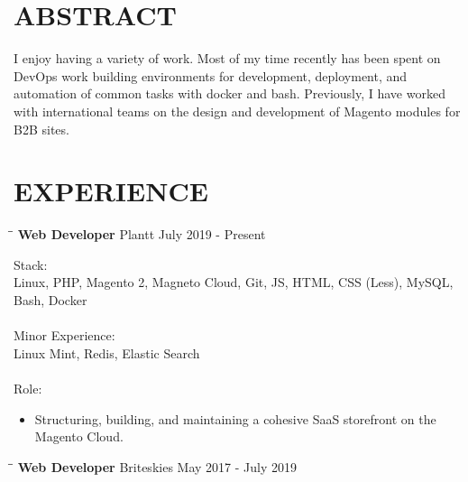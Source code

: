 \documentclass{res}
\begin{document}
\begin{resume}


\section{ABSTRACT}          
    I enjoy having a variety of work. Most of my time recently has been spent on DevOps work	building environments for development, deployment, and automation of common tasks with docker and bash. Previously, I have worked with international teams on the design and development of Magento modules for B2B sites.
 
 
\section{EXPERIENCE}
   \vspace{-0.1in}

   \begin{tabbing}
   		\hspace{2.0in}\= \hspace{2.7in}\= \kill %
    	\textbf{Web Developer} \>Plantt     \>July 2019 - Present\\
   \end{tabbing}\vspace{-20pt}      %
   
    Stack: \\
	Linux, PHP, Magento 2, Magneto Cloud, Git, JS, HTML, CSS (Less), MySQL, Bash, Docker \\
	\\
	Minor Experience: \\
	Linux Mint, Redis, Elastic Search \\
	\\
	Role: \\
	\vspace{-0.15in}	
	\begin{itemize}
		\item Structuring, building, and maintaining a cohesive SaaS storefront on the Magento Cloud.
	\end{itemize}
   
   \begin{tabbing}
   		\hspace{2.0in}\= \hspace{2.7in}\= \kill %
    	\textbf{Web Developer} \>Briteskies     \>May 2017 - July 2019\\
   \end{tabbing}\vspace{-20pt}      %
   

\end{resume}
\end{document}
